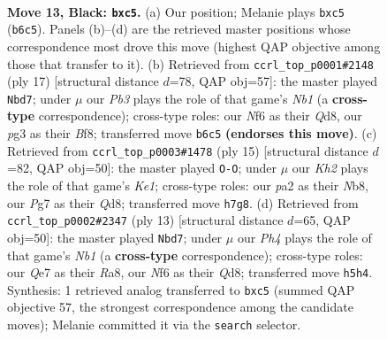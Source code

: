 \documentclass[11pt]{article}
\begin{document}
\clearpage

\begin{figure}[p]\centering
\begin{subfigure}{0.46\textwidth}\centering
\resizebox{\linewidth}{!}{%
\newchessgame
\chessboard[
  setfen={r1b2r2/p1ppqppk/1pn1pn2/1QP4p/3P4/2B2NP1/PP1KPP1P/R4B1R b - - 1 13},
  showmover=false,
  pgfstyle=straightmove, color=movearrow, markmove={b6-c5}
]}
\caption{}
\end{subfigure}\hfill
\begin{subfigure}{0.46\textwidth}\centering
\resizebox{\linewidth}{!}{%
\newchessgame
\chessboard[
  setfen={rn1qkb1r/pp3pp1/2p1pn2/3p4/4PQ1p/2NP3P/PPP1BPP1/R1B1K2R b KQkq - 1 9},
  showmover=false,
  pgfstyle=straightmove, color=movearrow, markmove={b8-d7}
]}
\caption{}
\end{subfigure}
\\[4pt]
\begin{subfigure}{0.46\textwidth}\centering
\resizebox{\linewidth}{!}{%
\newchessgame
\chessboard[
  setfen={rn1qk2r/pp3ppp/2p1pn2/2bp4/4P3/2NP1QPP/PPP2PB1/R1B1K2R b KQkq - 0 8},
  showmover=false,
  pgfstyle=straightmove, color=movearrow, markmove={e8-g8}
]}
\caption{}
\end{subfigure}\hfill
\begin{subfigure}{0.46\textwidth}\centering
\resizebox{\linewidth}{!}{%
\newchessgame
\chessboard[
  setfen={rn1qkb1r/pp3ppp/2p1pn2/3p4/4P3/2NP1Q1P/PPPB1PP1/R3KB1R b KQkq - 2 7},
  showmover=false,
  pgfstyle=straightmove, color=movearrow, markmove={b8-d7}
]}
\caption{}
\end{subfigure}
\caption{\textbf{Move 13, Black: \texttt{bxc5}.} (a) Our position; Melanie plays \texttt{bxc5} (\texttt{b6c5}). Panels (b)--(d) are the retrieved master positions whose correspondence most drove this move (highest QAP objective among those that transfer to it). (b) Retrieved from \texttt{ccrl\_top\_p0001\#2148} (ply 17) [structural distance $d$=78, QAP obj=57]: the master played \texttt{Nbd7}; under $\mu$ our \emph{Pb3} plays the role of that game's \emph{Nb1} (a \textbf{cross-type} correspondence); cross-type roles: our \emph{N}f6 as their \emph{Q}d8, our \emph{p}g3 as their \emph{B}f8; transferred move \texttt{b6c5} \textbf{(endorses this move)}. (c) Retrieved from \texttt{ccrl\_top\_p0003\#1478} (ply 15) [structural distance $d$=82, QAP obj=50]: the master played \texttt{O-O}; under $\mu$ our \emph{Kh2} plays the role of that game's \emph{Ke1}; cross-type roles: our \emph{p}a2 as their \emph{N}b8, our \emph{P}g7 as their \emph{Q}d8; transferred move \texttt{h7g8}. (d) Retrieved from \texttt{ccrl\_top\_p0002\#2347} (ply 13) [structural distance $d$=65, QAP obj=50]: the master played \texttt{Nbd7}; under $\mu$ our \emph{Ph4} plays the role of that game's \emph{Nb1} (a \textbf{cross-type} correspondence); cross-type roles: our \emph{Q}e7 as their \emph{R}a8, our \emph{N}f6 as their \emph{Q}d8; transferred move \texttt{h5h4}. Synthesis: 1 retrieved analog transferred to \texttt{bxc5} (summed QAP objective 57, the strongest correspondence among the candidate moves); Melanie committed it via the \texttt{search} selector.}
\label{fig:thought-m25}
\end{figure}
\end{document}
